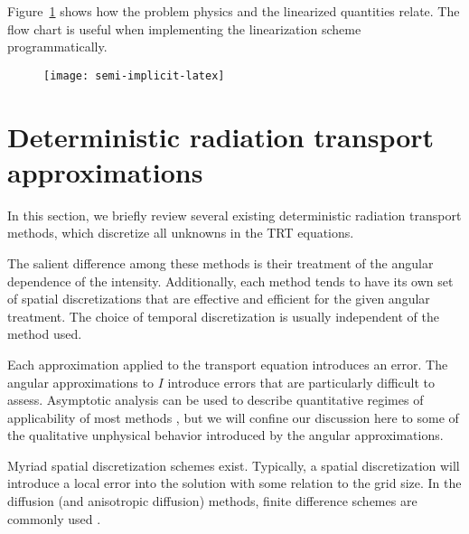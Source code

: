 Figure~\ref{fig:semiImplicitFlowchart} shows how the problem physics and the
linearized quantities relate. The flow chart is useful when
implementing the linearization scheme programmatically. 

\begin{figure}[htbp]
  \centering
  \texttt{[image: semi-implicit-latex]}
  \label{fig:semiImplicitFlowchart}
\end{figure}

\section{Deterministic radiation transport approximations}
\label{sec:bgApproxMethods}

In this section, we briefly review several existing deterministic radiation
transport methods, which discretize all unknowns in the TRT equations.

The salient difference among these methods is their treatment of
the angular dependence of the intensity. Additionally, each method tends to have
its own set of spatial discretizations that are effective and efficient for the
given angular treatment. The choice of temporal discretization is usually
independent of the method used.

Each approximation applied to the transport
equation introduces an error. The angular approximations to $I$
introduce errors that are particularly difficult to assess. Asymptotic
analysis can be used to describe quantitative regimes of applicability of most
methods \cite{Lar1983a,Ada1998a,Mor2000}, but we will confine our discussion
here to some of the qualitative
unphysical behavior introduced by the angular approximations.

Myriad spatial discretization schemes exist. Typically, a
spatial discretization will introduce a local error into the solution with some
relation to the grid size. In the diffusion (and anisotropic diffusion) methods,
finite difference schemes are commonly used \cite{Lev2007}.

